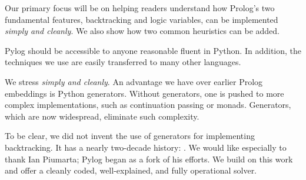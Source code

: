 Our primary focus will be on helping readers understand how Prolog's two fundamental features, backtracking and logic variables, can be implemented \textit{simply and cleanly}. We also show how two common heuristics can be added. 

Pylog should be accessible to anyone reasonable fluent in Python. In addition, the techniques we use are easily transferred to many other languages. 


We stress \textit{simply and cleanly}. An advantage we have over earlier Prolog embeddings is Python generators. Without generators, one is pushed to more complex implementations, such as continuation passing\cite{amin2019lightweight} or monads\cite{seres1999embedding}. Generators, which are now widespread\cite{wikipedia-generators}, eliminate such complexity.  %

To be clear, we did not invent the use of generators for implementing backtracking. It has a nearly two-decade history: \cite{berger2004, Bolz2007, Delford2009, Frederiksen2011, Meyers2015, Thompson2017, Santini2018, Cesar2019, Miljkovic2019}. We would like especially to thank Ian Piumarta\cite{Piumarta2017}; Pylog began as a fork of his efforts. We build on this work and offer a cleanly coded, well-explained, and fully operational solver.



